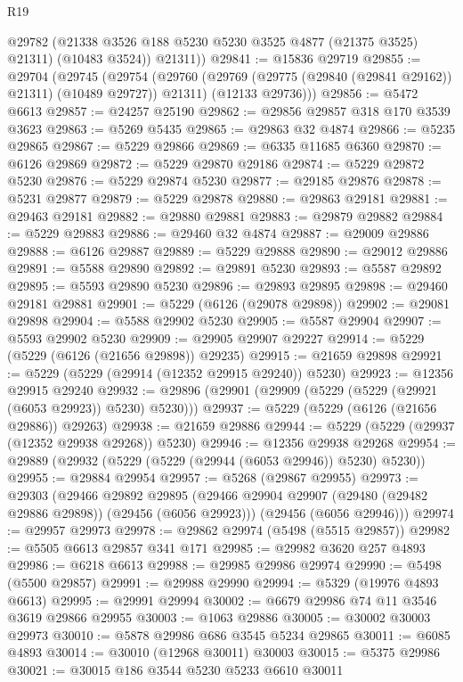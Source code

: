 \begin{lexlean}{R19}
\begin{coremodule}
          @29782
          (@21338 @3526 @188 @5230 @5230 @3525 @4877 (@21375 @3525) @21311)
          (@10483 @3524))
        @21311))
@29841 := @15836 @29719
@29855 := @29704
    (@29745
      (@29754
        (@29760 (@29769 (@29775 (@29840 (@29841 @29162)) @21311) (@10489 @29727)) @21311)
        (@12133 @29736)))
@29856 := @5472 @6613
@29857 := @24257 @25190
@29862 := @29856 @29857 @318 @170 @3539 @3623
@29863 := @5269 @5435
@29865 := @29863 @32 @4874
@29866 := @5235 @29865
@29867 := @5229 @29866
@29869 := @6335 @11685 @6360
@29870 := @6126 @29869
@29872 := @5229 @29870 @29186
@29874 := @5229 @29872 @5230
@29876 := @5229 @29874 @5230
@29877 := @29185 @29876
@29878 := @5231 @29877
@29879 := @5229 @29878
@29880 := @29863 @29181
@29881 := @29463 @29181
@29882 := @29880 @29881
@29883 := @29879 @29882
@29884 := @5229 @29883
@29886 := @29460 @32 @4874
@29887 := @29009 @29886
@29888 := @6126 @29887
@29889 := @5229 @29888
@29890 := @29012 @29886
@29891 := @5588 @29890
@29892 := @29891 @5230
@29893 := @5587 @29892
@29895 := @5593 @29890 @5230
@29896 := @29893 @29895
@29898 := @29460 @29181 @29881
@29901 := @5229 (@6126 (@29078 @29898))
@29902 := @29081 @29898
@29904 := @5588 @29902 @5230
@29905 := @5587 @29904
@29907 := @5593 @29902 @5230
@29909 := @29905 @29907 @29227
@29914 := @5229 (@5229 (@6126 (@21656 @29898)) @29235)
@29915 := @21659 @29898
@29921 := @5229 (@5229 (@29914 (@12352 @29915 @29240)) @5230)
@29923 := @12356 @29915 @29240
@29932 := @29896 (@29901 (@29909 (@5229 (@5229 (@29921 (@6053 @29923)) @5230) @5230)))
@29937 := @5229 (@5229 (@6126 (@21656 @29886)) @29263)
@29938 := @21659 @29886
@29944 := @5229 (@5229 (@29937 (@12352 @29938 @29268)) @5230)
@29946 := @12356 @29938 @29268
@29954 := @29889 (@29932 (@5229 (@5229 (@29944 (@6053 @29946)) @5230) @5230))
@29955 := @29884 @29954
@29957 := @5268 (@29867 @29955)
@29973 := @29303
    (@29466
      @29892
      @29895
      (@29466 @29904 @29907 (@29480 (@29482 @29886 @29898)) (@29456 (@6056 @29923)))
      (@29456 (@6056 @29946)))
@29974 := @29957 @29973
@29978 := @29862 @29974 (@5498 (@5515 @29857))
@29982 := @5505 @6613 @29857 @341 @171
@29985 := @29982 @3620 @257 @4893
@29986 := @6218 @6613
@29988 := @29985 @29986 @29974
@29990 := @5498 (@5500 @29857)
@29991 := @29988 @29990
@29994 := @5329 (@19976 @4893 @6613)
@29995 := @29991 @29994
@30002 := @6679 @29986 @74 @11 @3546 @3619 @29866 @29955
@30003 := @1063 @29886
@30005 := @30002 @30003 @29973
@30010 := @5878 @29986 @686 @3545 @5234 @29865
@30011 := @6085 @4893
@30014 := @30010 (@12968 @30011) @30003
@30015 := @5375 @29986
@30021 := @30015 @186 @3544 @5230 @5233 @6610 @30011

\end{coremodule}
\end{lexlean}
